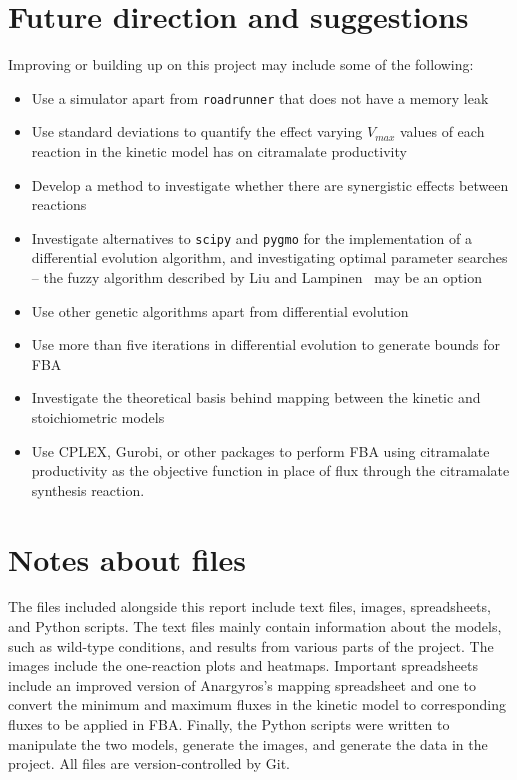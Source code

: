 \documentclass[parskip=full, numbers=noenddot]{scrreprt}
\begin{document}
\section{Future direction and suggestions}
\label{sec:future}

Improving or building up on this project may include some of the following:

\begin{itemize}
\item Use a simulator apart from \texttt{roadrunner} that does not have a memory leak
\item Use standard deviations to quantify the effect varying $V_{max}$ values of each reaction in the kinetic model has on citramalate productivity
\item Develop a method to investigate whether there are synergistic effects between reactions
\item Investigate alternatives to \texttt{scipy} and \texttt{pygmo} for the implementation of a differential evolution algorithm, and investigating optimal parameter searches -- the fuzzy algorithm described by Liu and Lampinen~\cite{liu_fuzzy_2005} may be an option
\item Use other genetic algorithms apart from differential evolution
\item Use more than five iterations in differential evolution to generate bounds for FBA
\item Investigate the theoretical basis behind mapping between the kinetic and stoichiometric models
  \item Use CPLEX, Gurobi, or other packages to perform FBA using citramalate productivity as the objective function in place of flux through the citramalate synthesis reaction.
\end{itemize}
  
\section{Notes about files}
\label{sec:files}

The files included alongside this report include text files, images, spreadsheets, and Python scripts. The text files mainly contain information about the models, such as wild-type conditions, and results from various parts of the project. The images include the one-reaction plots and heatmaps. Important spreadsheets include an improved version of Anargyros's mapping spreadsheet and one to convert the minimum and maximum fluxes in the kinetic model to corresponding fluxes to be applied in FBA. Finally, the Python scripts were written to manipulate the two models, generate the images, and generate the data in the project. All files are version-controlled by Git.
\end{document}
